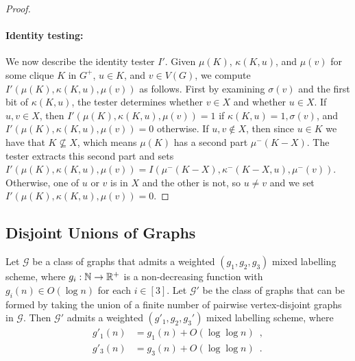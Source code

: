 \documentclass{patmorin}
\newcommand{\Oh}{O}
\newcommand{\calG}{\mathcal{G}}
\begin{document}
\begin{proof}
  \paragraph{Identity testing:}
  We now describe the identity tester $I'$.
  Given $\mu(K)$, $\kappa(K,u)$, and $\mu(v)$ for some clique $K$ in $G^+$, $u\in K$, and $v\in V(G)$,
  we compute $I'(\mu(K),\kappa(K,u),\mu(v))$ as follows.
  First by examining $\sigma(v)$ and the first bit of $\kappa(K,u)$, the tester determines whether $v\in X$ and whether $u\in X$.
  If $u,v\in X$, then $I'(\mu(K),\kappa(K,u),\mu(v))=1$ if $\kappa(K,u)=1,\sigma(v)$, and $I'(\mu(K),\kappa(K,u),\mu(v))=0$ otherwise.
  If $u,v\not\in X$, then since $u\in K$ we have that $K\not\subseteq X$, which means $\mu(K)$ has a second part $\mu^-(K-X)$. The tester extracts this second part and sets
  $I'(\mu(K),\kappa(K,u),\mu(v)) = I(\mu^-(K-X),\kappa^-(K-X,u),\mu^-(v))$.
  Otherwise, one of $u$ or $v$ is in $X$ and the other is not, so $u\neq v$ and we set $I'(\mu(K),\kappa(K,u),\mu(v)) =0$.
  \qedhere
\end{proof}

\subsection{Disjoint Unions of Graphs}
\label{sec:disjoint}

\begin{lem}\label{disjoint_union_ii}
  Let $\calG$ be a class of graphs that admits a weighted $(g_1,g_2,g_3)$ mixed labelling scheme, where $g_i:\mathbb{N}\to\mathbb{R}^+$ is a non-decreasing function  with $g_i(n)\in \Oh(\log n)$ for each $i\in[3]$. Let $\calG'$ be the class of graphs that can be formed by taking the union of a finite number of pairwise vertex-disjoint graphs in $\calG$.
  Then $\calG'$ admits a weighted $(g'_1,g_2,g_3')$ mixed labelling scheme, where
  \begin{align*}
    g'_1(n)
     & = g_1(n)+\Oh(\log\log n)\enspace,   \\
    g'_3(n)
     & = g_3(n)+\Oh(\log\log n) \enspace .
  \end{align*}
\end{lem}
\end{document}
